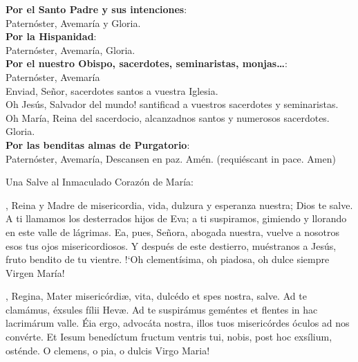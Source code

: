 \documentclass[./L00_main.tex]{subfiles}
\begin{document}
\textbf{Por el Santo Padre y sus intenciones}:\\
\hspace*{10mm}Paternóster, Avemaría y Gloria.\\
\textbf{Por la Hispanidad}:\\ 
\hspace*{10mm}Paternóster, Avemaría, Gloria.\\
\textbf{Por el nuestro Obispo, sacerdotes, seminaristas, monjas\ldots}:\\ 
\hspace*{10mm}Paternóster, Avemaría\\
\hspace*{10mm}Enviad, Señor, sacerdotes santos a vuestra Iglesia.\\
\hspace*{10mm}{!`}Oh Jesús, Salvador del mundo! santificad a vuestros sacerdotes y seminaristas.\\
\hspace*{10mm}Oh María, Reina del sacerdocio, alcanzadnos santos y numerosos sacerdotes.\\
\hspace*{10mm}Gloria.\\
\textbf{Por las benditas almas de Purgatorio}:\\
\hspace*{10mm}Paternóster, Avemaría, Descansen en paz. Amén. (requiéscant in pace. Amen)

\bigskip
{\label{hailMaryQueen}}Una Salve al Inmaculado Corazón de María:\\
\smallskip
\begin{minipage}[t]{0.475\textwidth}
    , Reina y Madre de misericordia, vida, dulzura y esperanza nuestra; Dios te salve.
    A ti llamamos los desterrados hijos de Eva; a ti suspiramos, gimiendo y llorando en este valle de lágrimas.
    Ea, pues, Señora, abogada nuestra, vuelve a nosotros esos tus ojos misericordiosos. Y después de este destierro, muéstranos a Jesús,
    fruto bendito de tu vientre. {!`}Oh clementísima, oh piadosa, oh dulce siempre Virgen María!\\
    \ruegapornosotrossalve
\end{minipage}
\begin{minipage}[t]{0.475\textwidth}
    , Regina, Mater misericórdi{\ae}, vita, dulcédo et spes nostra, salve. Ad te clamámus, éxsules fílii Hev{\ae}.
    Ad te suspirámus geméntes et flentes in hac lacrimárum valle. Éia ergo, advocáta nostra, illos tuos misericórdes óculos ad nos convérte.
    Et Iesum benedíctum fructum ventris tui, nobis, post hoc exsílium, osténde. O clemens, o pia, o dulcis Virgo Maria!\\
    \orapronobissalve
\end{minipage}
\end{document}
